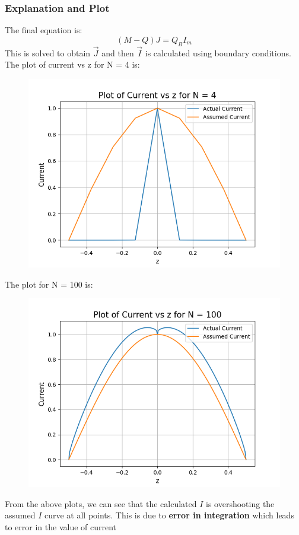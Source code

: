\documentclass[12pt, a4paper]{article}
\begin{document}
\subsubsection{Explanation and Plot}
The final equation is:
\vspace*{0.5cm}
\begin{equation*}
    (M-Q)J = Q_{B}I_{m}
\end{equation*}
\vspace*{0.5cm}
This is solved to obtain $\vec{J}$ and then $\vec{I}$ is calculated using boundary conditions. The plot of current vs z for N = 4 is:
\begin{figure}[H]
    \centering
    \includegraphics[scale = 0.8]{Figure_1.png}
    \label{fig:sample}
\end{figure}
The plot for N = 100 is:
\begin{figure}[H]
    \centering
    \includegraphics[scale = 0.8]{Figure_2.png}
    \label{fig:sample}
\end{figure}
From the above plots, we can see that the calculated $I$ is overshooting the assumed $I$ curve at all points. This is due to \textbf{error in integration} which leads to error in the value of current
\end{document}
